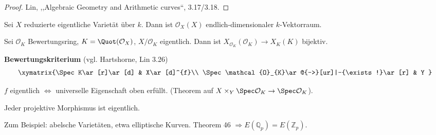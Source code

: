 \begin{proof}
  Lin, ,,Algebraic Geometry and Arithmetic curves``, 3.17/3.18.
\end{proof}
\begin{cor}
  Sei $X$ reduzierte eigentliche Varietät über $k$. Dann ist $\mathcal{O}_{X}(X)$
  endlich-dimensionaler $k$-Vektorraum.
\end{cor}

\begin{thm}[45]
  Sei $\mathcal{O}_{K}$ Bewertungsring, $K=\Quot(\mathcal{O}_{X})$,
  $X/\mathcal{O}_{K}$ eigentlich. Dann ist $X_{\mathcal{O}_{K}}(\mathcal{O}_{K})\rightarrow X_{K}(K)$
  bijektiv.
\end{thm}

\textbf{Bewertungskriterium }(vgl. Hartshorne, Lin 3.26)
\[
  \xymatrix{\Spec K\ar[r]\ar[d] & X\ar[d]^{f}\\
    \Spec\mathcal{O}_{K}\ar@{-->}[ur]|-{\exists!}\ar[r] & Y
  }
\]

$f$ eigentlich $\Longleftrightarrow$ universelle Eigenschaft oben
erfüllt. (Theorem auf $X\times_{Y}\Spec\mathcal{O}_{K}\rightarrow\Spec\mathcal{O}_{K}$).
\begin{thm}
  Jeder projektive Morphismus ist eigentlich.
\end{thm}

Zum Beispiel: abelsche Varietäten, etwa elliptische Kurven. Theorem
46 $\Longrightarrow E(\mathbb{Q}_{p})=E(\mathbb{Z}_{p})$.
